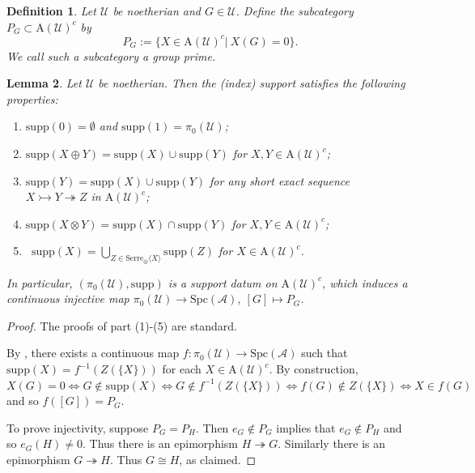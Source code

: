 \documentclass[11pt,a4paper]{amsart}
\numberwithin{equation}{section} \theoremstyle{plain}
\newtheorem{lem}{Lemma}[section]
\newtheorem{definition}[lem]{Definition}
\newenvironment{df}{\begin{definition}\rm}{\end{definition}}
\begin{document}
\begin{df} Let $\mathcal{U}$ be noetherian and $G\in \mathcal{U}$. Define the subcategory $P_{G}\subset \mathrm{A}(\mathcal{U})^{c}$ by $$P_{G}:=\{X\in \mathrm{A}(\mathcal{U})^{c}|~X(G)=0\}.$$ We call such a subcategory a group prime.
\end{df}
\begin{lem}\label{lem4.6}Let $\mathcal{U}$ be noetherian. Then the (index) support satisfies the following properties:
\begin{enumerate}
\item $\mathrm{supp}(0)=\emptyset$ and $\mathrm{supp}(\mathrm{1})=\pi_{0}(\mathcal{U})$;

\item $\mathrm{supp}(X\oplus Y)=\mathrm{supp}(X)\cup \mathrm{supp}(Y)$ for $X,Y\in \mathrm{A}(\mathcal{U})^{c}$;

\item $\mathrm{supp}(Y)=\mathrm{supp}(X)\cup \mathrm{supp}(Y)$ for any short exact sequence $X\rightarrowtail Y\twoheadrightarrow Z$ in $\mathrm{A}(\mathcal{U})^{c}$;

\item $\mathrm{supp}(X\otimes Y)=\mathrm{supp}(X)\cap \mathrm{supp}(Y)$ for $X,Y\in \mathrm{A}(\mathcal{U})^{c}$;

\item ~$\mathrm{supp}(X)=\bigcup_{Z\in \mathrm{Serre}_{\otimes}\langle X\rangle}\mathrm{supp}(Z)$ for $X\in \mathrm{A}(\mathcal{U})^{c}$.

\end{enumerate}
In particular, $(\pi_{0}(\mathcal{U}), \mathrm{supp})$ is a support datum on $\mathrm{A}(\mathcal{U})^{c}$, which induces a continuous injective map $\pi_{0}(\mathcal{U})\rightarrow \mathrm{Spc}(\mathcal{A})$, $[G]\mapsto P_{G}$.
\end{lem}
\begin{proof}The proofs of part (1)-(5) are standard.

 By \cite[Theorem 5.3]{BKS}, there exists a continuous map $f:\pi_{0}(\mathcal{U})\rightarrow \mathrm{Spc}(\mathcal{A})$ such that $\mathrm{supp}(X)=f^{-1}(Z(\{X\}))$ for each $X\in \mathrm{A}(\mathcal{U})^{c}$. By construction, $X(G)=0\Leftrightarrow G\notin \mathrm{supp}(X)\Leftrightarrow G\notin f^{-1}(Z(\{X\}))\Leftrightarrow f(G)\notin Z(\{X\})\Leftrightarrow X\in f(G)$ and so $f([G])=P_{G}$.

  To prove injectivity, suppose $P_{G}=P_{H}$. Then $e_{G}\notin P_{G}$ implies that $e_{G}\notin P_{H}$ and so $e_{G}(H)\neq 0$. Thus there is an epimorphism $H\twoheadrightarrow G$. Similarly there is an epimorphism $G\twoheadrightarrow H$. Thus $G\cong H$, as claimed.
\end{proof}
\end{document}
